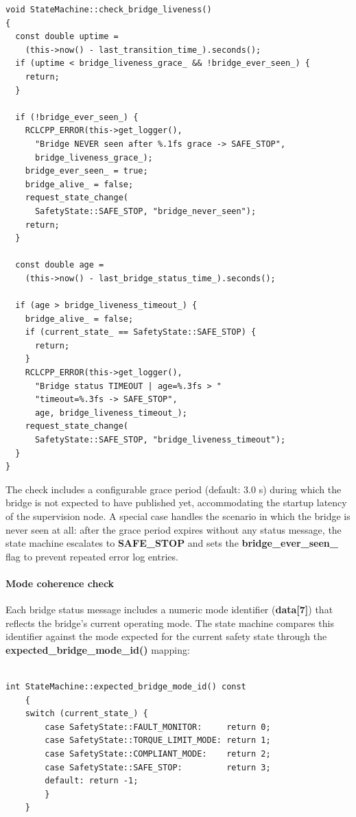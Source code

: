 \begin{verbatim}
void StateMachine::check_bridge_liveness()
{
  const double uptime =
    (this->now() - last_transition_time_).seconds();
  if (uptime < bridge_liveness_grace_ && !bridge_ever_seen_) {
    return;
  }

  if (!bridge_ever_seen_) {
    RCLCPP_ERROR(this->get_logger(),
      "Bridge NEVER seen after %.1fs grace -> SAFE_STOP",
      bridge_liveness_grace_);
    bridge_ever_seen_ = true;
    bridge_alive_ = false;
    request_state_change(
      SafetyState::SAFE_STOP, "bridge_never_seen");
    return;
  }

  const double age =
    (this->now() - last_bridge_status_time_).seconds();

  if (age > bridge_liveness_timeout_) {
    bridge_alive_ = false;
    if (current_state_ == SafetyState::SAFE_STOP) {
      return;
    }
    RCLCPP_ERROR(this->get_logger(),
      "Bridge status TIMEOUT | age=%.3fs > "
      "timeout=%.3fs -> SAFE_STOP",
      age, bridge_liveness_timeout_);
    request_state_change(
      SafetyState::SAFE_STOP, "bridge_liveness_timeout");
  }
}

\end{verbatim}

The check includes a configurable grace period (default: 3.0 s) during which the bridge is not expected to have published yet, accommodating the startup latency of the supervision node. A special case handles the scenario in which the bridge is never seen at all: after the grace period expires without any status message, the state machine escalates to \textbf{SAFE\_STOP} and sets the \textbf{bridge\_ever\_seen\_} flag to prevent repeated error log entries.

\paragraph{Mode coherence check}  Each bridge status message includes a numeric mode identifier (\textbf{data[7]}) that reflects the bridge's current operating mode. The state machine compares this identifier against the mode expected for the current safety state through the \textbf{expected\_bridge\_mode\_id()} mapping:

\begin{verbatim}

int StateMachine::expected_bridge_mode_id() const
    {
    switch (current_state_) {
        case SafetyState::FAULT_MONITOR:     return 0;
        case SafetyState::TORQUE_LIMIT_MODE: return 1;
        case SafetyState::COMPLIANT_MODE:    return 2;
        case SafetyState::SAFE_STOP:         return 3;
        default: return -1;
        }
    }

\end{verbatim}

